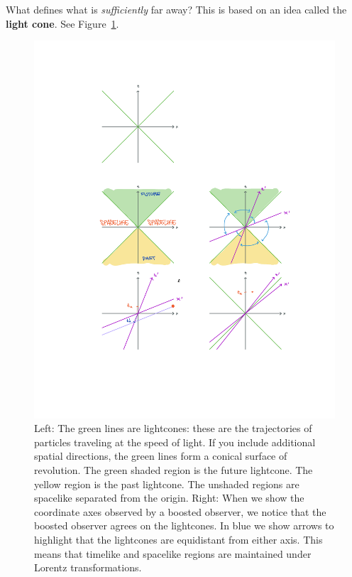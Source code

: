 \documentclass[12pt, oneside]{report}    %
\begin{document}
What defines what is \emph{sufficiently} far away? This is based on an idea called the \textbf{light cone}. See Figure~\ref{fig:lightcone}.
\begin{figure}[ht]
\includegraphics[width=.8\textwidth]{figures/spacetime_lightcone.pdf}
    \caption{Left: The green lines are lightcones: these are the trajectories of particles traveling at the speed of light. If you include additional spatial directions, the green lines form a conical surface of revolution. The green shaded region is the future lightcone. The yellow region is the past lightcone. The unshaded regions are spacelike separated from the origin. Right: When we show the coordinate axes observed by a boosted observer, we notice that the boosted observer agrees on the lightcones. In blue we show arrows to highlight that the lightcones are equidistant from either axis. This means that timelike and spacelike regions are maintained under Lorentz transformations.}
    \label{fig:lightcone}
\end{figure}
\end{document}
